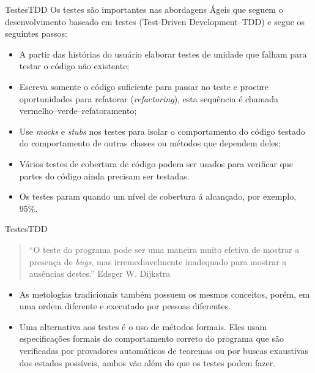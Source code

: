 
\lecturetitle{\insertlecture}{\course}
\maketitle

\begin{frame}{Testes}{TDD}\small
  Os testes são importantes nas abordagens Ágeis que seguem o
  desenvolvimento baseado em testes (Test-Driven Development--TDD)
  e segue os seguintes passos:
  \begin{itemize}[<+-| alert@+>]
  \item A partir das histórias do usuário elaborar testes de unidade
    que falham para testar o código não existente;
  \item Escreva somente o código suficiente para passar no teste
    e procure oportunidades para refatorar ({\em refactoring}), esta
    sequência é chamada vermelho--verde--refatoramento;
  \item Use {\em mocks} e {\em stubs} nos testes para isolar o
    comportamento do código testado do comportamento de outras classes
    ou métodos que dependem deles;
  \item Vários testes de cobertura de código podem ser usados para
    verificar que partes do código ainda precisam ser testadas.
  \item Os testes param quando um nível de cobertura á alcançado, por
    exemplo, 95\%.
  \end{itemize}  
\end{frame}

\begin{frame}{Testes}{TDD}\small

  \begin{quote}
    ``O teste do programa pode ser uma maneira muito efetiva de mostrar
    a presença de {\em bugs}, mas irremediavelmente inadequado para
    mostrar a ausências destes.'' Edsger W. Dijkstra
  \end{quote}
  
  \begin{itemize}[<+-| alert@+>]
  \item As metologias tradicionais também possuem os mesmos conceitos,
    porém, em uma ordem diferente e executado por pessoas diferentes.
  \item Uma alternativa aos testes é o uso de métodos formais. Eles
    usam especificações formais do comportamento correto do programa
    que são verificadas por provadores automáticos de teoremas ou
    por buscas exaustivas dos estados possíveis, ambos vão além do que
    os testes podem fazer.
  \end{itemize}
  
\end{frame}

